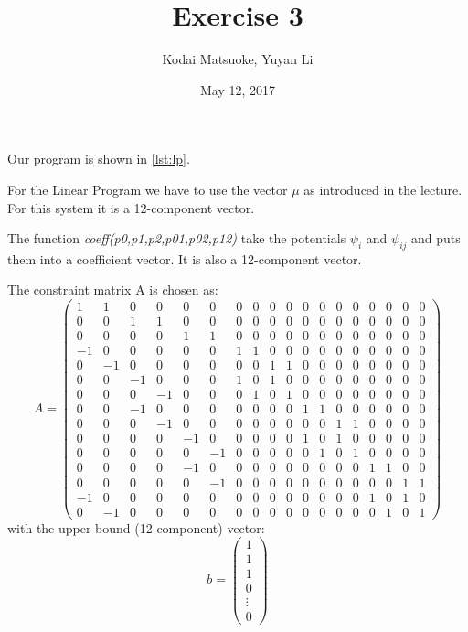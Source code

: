 \documentclass[12pt,a4paper]{scrartcl}
\author{Kodai Matsuoke, Yuyan Li}
\title{Exercise 3}
\date{May 12, 2017}
\begin{document}
\maketitle

Our program is shown in \cref{lst:lp}.

For the Linear Program we have to use the vector $\mu$ as introduced in the lecture. For this system it is a 12-component vector.

The function \textit{coeff(p0,p1,p2,p01,p02,p12)} take the potentials $\psi_i$ and $\psi_{ij}$ and puts them into a coefficient vector. It is also a 12-component vector.

The constraint matrix A is chosen as:
\begin{equation}
   A =
   \begin{pmatrix}
   1 & 1 & 0 & 0 & 0 & 0 & 0 & 0 & 0 & 0 & 0 & 0 & 0 & 0 & 0 & 0 & 0 & 0 \\
   0 & 0 & 1 & 1 & 0 & 0 & 0 & 0 & 0 & 0 & 0 & 0 & 0 & 0 & 0 & 0 & 0 & 0 \\
   0 & 0 & 0 & 0 & 1 & 1 & 0 & 0 & 0 & 0 & 0 & 0 & 0 & 0 & 0 & 0 & 0 & 0 \\
   -1 & 0 & 0 & 0 & 0 & 0 & 1 & 1 & 0 & 0 & 0 & 0 & 0 & 0 & 0 & 0 & 0 & 0 \\
   0 & -1 & 0 & 0 & 0 & 0 & 0 & 0 & 1 & 1 & 0 & 0 & 0 & 0 & 0 & 0 & 0 & 0 \\
   0 & 0 & -1 & 0 & 0 & 0 & 1 & 0 & 1 & 0 & 0 & 0 & 0 & 0 & 0 & 0 & 0 & 0 \\
   0 & 0 & 0 & -1 & 0 & 0 & 0 & 1 & 0 & 1 & 0 & 0 & 0 & 0 & 0 & 0 & 0 & 0 \\
   0 & 0 & -1 & 0 & 0 & 0 & 0 & 0 & 0 & 0 & 1 & 1 & 0 & 0 & 0 & 0 & 0 & 0 \\
   0 & 0 & 0 & -1 & 0 & 0 & 0 & 0 & 0 & 0 & 0 & 0 & 1 & 1 & 0 & 0 & 0 & 0 \\
   0 & 0 & 0 & 0 & -1 & 0 & 0 & 0 & 0 & 0 & 1 & 0 & 1 & 0 & 0 & 0 & 0 & 0 \\
   0 & 0 & 0 & 0 & 0 & -1 & 0 & 0 & 0 & 0 & 0 & 1 & 0 & 1 & 0 & 0 & 0 & 0 \\
   0 & 0 & 0 & 0 & -1 & 0 & 0 & 0 & 0 & 0 & 0 & 0 & 0 & 0 & 1 & 1 & 0 & 0 \\
   0 & 0 & 0 & 0 & 0 & -1 & 0 & 0 & 0 & 0 & 0 & 0 & 0 & 0 & 0 & 0 & 1 & 1 \\
   -1 & 0 & 0 & 0 & 0 & 0 & 0 & 0 & 0 & 0 & 0 & 0 & 0 & 0 & 1 & 0 & 1 & 0 \\
   0 & -1 & 0 & 0 & 0 & 0 & 0 & 0 & 0 & 0 & 0 & 0 & 0 & 0 & 0 & 1 & 0 & 1
   \end{pmatrix}
\end{equation}
with the upper bound (12-component) vector:
\[
  b = 
  \begin{pmatrix}
    1 \\
    1 \\
    1 \\
    0 \\
    \vdots \\
    0
  \end{pmatrix}
\]
\end{document}
